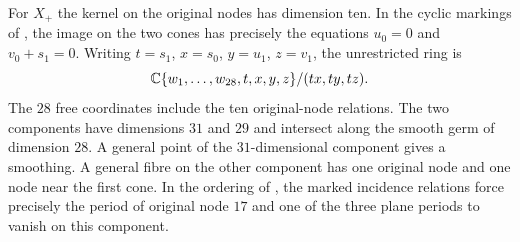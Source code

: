 For $X_+$ the kernel on the original nodes has dimension ten.
In the cyclic markings of \cite[\S5]{Partial}, the image on the two
cones has precisely the equations $u_0=0$ and $v_0+s_1=0$.
Writing $t=s_1$, $x=s_0$, $y=u_1$, $z=v_1$, the unrestricted ring is
\[
 \mathbb C\{w_1,\ldots,w_{28},t,x,y,z\}/(tx,ty,tz).
\]
The $28$ free coordinates include the ten original-node relations.
The two components have dimensions $31$ and $29$ and intersect along
the smooth germ of dimension $28$. A general point of the
$31$-dimensional component gives a smoothing. A general fibre on the other
component has one original node and one node near the first cone. In the ordering of \cite[\S5]{Partial}, the marked incidence relations
force precisely the period of original node $17$ and one of the three
plane periods to vanish on this component.

